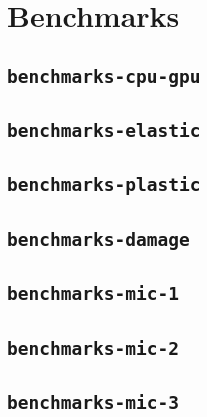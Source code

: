 
\section{Benchmarks}


\subsection{\texttt{benchmarks-cpu-gpu}}
\subsection{\texttt{benchmarks-elastic}}
\subsection{\texttt{benchmarks-plastic}}
\subsection{\texttt{benchmarks-damage}}
\subsection{\texttt{benchmarks-mic-1}}
\subsection{\texttt{benchmarks-mic-2}}
\subsection{\texttt{benchmarks-mic-3}}
